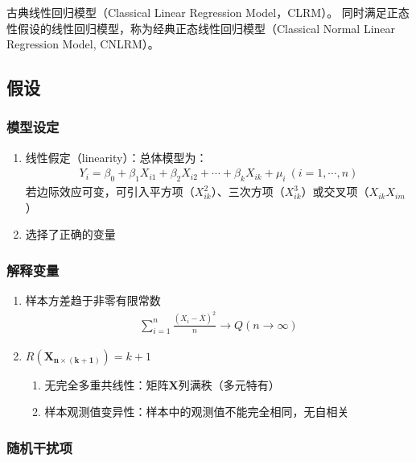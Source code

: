 \documentclass[12pt]{book}
\begin{document}
古典线性回归模型（Classical Linear Regression Model，CLRM）。 同时满足正态性假设的线性回归模型，称为经典正态线性回归模型（Classical Normal Linear Regression Model, CNLRM）。

\subsection{假设}

\subsubsection{模型设定}


\begin{enumerate}[1.]
    \item 线性假定（linearity）：总体模型为：
          \begin{gather*}
              Y_i=\beta_0+\beta_1X_{i1}+\beta_2X_{i2}+\cdots+\beta_kX_{ik}+\mu_i\ \left(i=1,\cdots,n\right)
          \end{gather*}
          若边际效应可变，可引入平方项（$X_{ik}^2$）、三次方项（$X_{ik}^3$）或交叉项（$X_{ik}X_{im}$）
    \item 选择了正确的变量
\end{enumerate}




\subsubsection{解释变量}


\begin{enumerate}[1.]
    \item 样本方差趋于非零有限常数
    \begin{gather*}
        \sum_{i=1}^{n}\frac{\left(X_i-\bar{X}\right)^2}{n}\rightarrow Q (n\rightarrow \infty )
    \end{gather*}
    \item $R\left(\bm{X}_{\bm{n}\times\left(\bm{k}+\bm{1}\right)}\right)=k+1$
    \begin{enumerate}[(1)]
        \item 无完全多重共线性：矩阵$\bm{X}$列满秩（多元特有）
        \item 样本观测值变异性：样本中的观测值不能完全相同，无自相关
    \end{enumerate}
\end{enumerate}




\subsubsection{随机干扰项}
\end{document}
